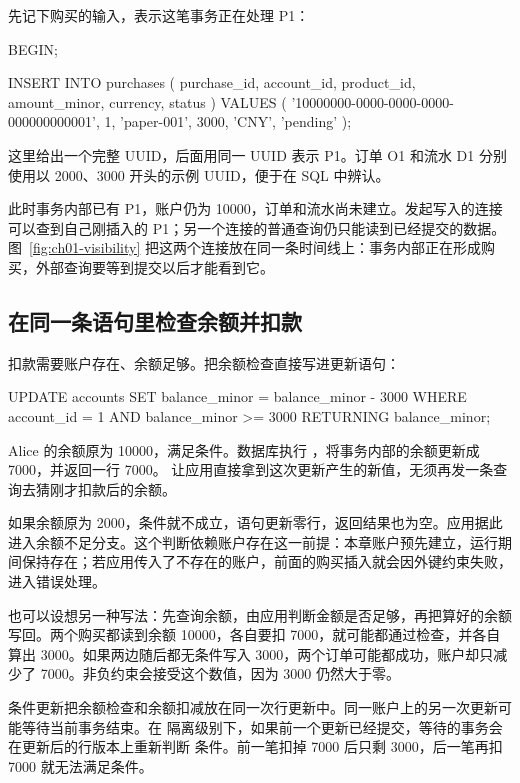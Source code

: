 先记下购买的输入，表示这笔事务正在处理 P1：

\begin{BookCode}
BEGIN;

INSERT INTO purchases (
    purchase_id, account_id, product_id,
    amount_minor, currency, status
) VALUES (
    '10000000-0000-0000-0000-000000000001',
    1, 'paper-001', 3000, 'CNY', 'pending'
);
\end{BookCode}

这里给出一个完整 UUID，后面用同一 UUID 表示 P1。订单 O1 和流水 D1 分别使用以 2000、3000 开头的示例 UUID，便于在 SQL 中辨认。

此时事务内部已有 P1，账户仍为 10000，订单和流水尚未建立。发起写入的连接可以查到自己刚插入的 P1；另一个连接的普通查询仍只能读到已经提交的数据。图~\ref{fig:ch01-visibility} 把这两个连接放在同一条时间线上：事务内部正在形成购买，外部查询要等到提交以后才能看到它。



\subsection*{在同一条语句里检查余额并扣款}

扣款需要账户存在、余额足够。把余额检查直接写进更新语句：

\begin{BookCode}
UPDATE accounts
SET balance_minor = balance_minor - 3000
WHERE account_id = 1
  AND balance_minor >= 3000
RETURNING balance_minor;
\end{BookCode}

Alice 的余额原为 10000，满足条件。数据库执行 ，将事务内部的余额更新成 7000，并返回一行 7000。 让应用直接拿到这次更新产生的新值，无须再发一条查询去猜刚才扣款后的余额。

如果余额原为 2000，条件就不成立，语句更新零行，返回结果也为空。应用据此进入余额不足分支。这个判断依赖账户存在这一前提：本章账户预先建立，运行期间保持存在；若应用传入了不存在的账户，前面的购买插入就会因外键约束失败，进入错误处理。

也可以设想另一种写法：先查询余额，由应用判断金额是否足够，再把算好的余额写回。两个购买都读到余额 10000，各自要扣 7000，就可能都通过检查，并各自算出 3000。如果两边随后都无条件写入 3000，两个订单可能都成功，账户却只减少了 7000。非负约束会接受这个数值，因为 3000 仍然大于零。

条件更新把余额检查和余额扣减放在同一次行更新中。同一账户上的另一次更新可能等待当前事务结束。在  隔离级别下，如果前一个更新已经提交，等待的事务会在更新后的行版本上重新判断  条件。前一笔扣掉 7000 后只剩 3000，后一笔再扣 7000 就无法满足条件。

